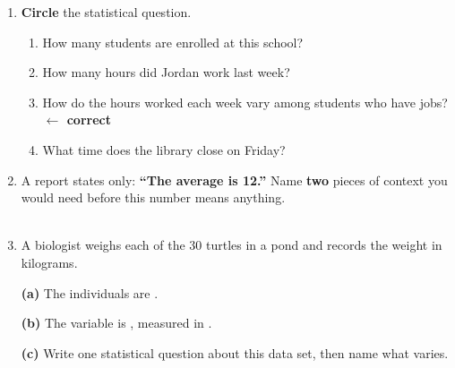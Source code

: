 \documentclass[10pt]{article}
\begin{document}

\vspace{0.15in}

\begin{enumerate}[leftmargin=1.7em, itemsep=0.20in]

  \item \textbf{Circle} the statistical question.
        \begin{enumerate}[label=\textbf{(\Alph*)}, leftmargin=2em, itemsep=4pt]
          \item How many students are enrolled at this school?
          \item How many hours did Jordan work last week?
          \item How do the hours worked each week vary among students who have jobs?
                \textcolor{keyred}{\textbf{$\leftarrow$ correct}}
          \item What time does the library close on Friday?
        \end{enumerate}

  \item A report states only: \textbf{``The average is 12.''} Name \textbf{two} pieces
        of context you would need before this number means anything.\\[4pt]
        \\[1pt]

  \item A biologist weighs each of the 30 turtles in a pond and records the weight in
        kilograms.
        \vspace{6pt}

        \textbf{(a)} The individuals are .

        \vspace{6pt}
        \textbf{(b)} The variable is , measured in .

        \vspace{8pt}
        \textbf{(c)} Write one statistical question about this data set, then name what
        varies.\\[4pt]
        \\[1pt]

\end{enumerate}
\end{document}

